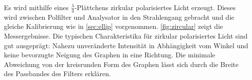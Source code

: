 Es wird mithilfe eines $\frac{\lambda}{4}$-Plättchens zirkular polarisiertes Licht erzeugt.
Dieses wird zwischen Polfilter und Analysator in den Strahlengang gebracht und die gleiche Kalibrierung wie in \autoref{sec:ellip} vorgenommen.
\autoref{fig:zircular} zeigt die Messergebnisse.
Die typischen Charakteristika für zirkular polarisiertes Licht sind gut ausgeprägt:
Nahezu unveränderte Intensität in Abhängigkeit vom Winkel und keine bevorzugte Neigung des Graphen in eine Richtung.
Die minimale Abweichung von der kreisrunden Form des Graphen lässt sich durch die Breite des Passbandes des Filters erklären.
